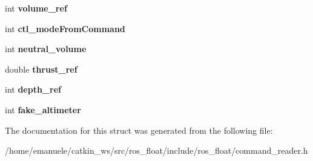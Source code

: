 \begin{DoxyCompactItemize}
\mbox{\label{structCOMMAND__DATA_aa388498d39ba68b844029475340e4e50}} 
int {\bfseries volume\+\_\+ref}
\item 
\mbox{\label{structCOMMAND__DATA_ab390b2dbaa1156a77bf6e3d080af9a35}} 
int {\bfseries ctl\+\_\+mode\+From\+Command}
\item 
\mbox{\label{structCOMMAND__DATA_a9026209f19fb19335030c597bda7ad18}} 
int {\bfseries neutral\+\_\+volume}
\item 
\mbox{\label{structCOMMAND__DATA_a2609af5c454ba633d2b944ceb129dbe3}} 
double {\bfseries thrust\+\_\+ref}
\item 
\mbox{\label{structCOMMAND__DATA_aa4a25bc088fa380f1900f6a53e323e85}} 
int {\bfseries depth\+\_\+ref}
\item 
\mbox{\label{structCOMMAND__DATA_a98b7d0b13fdf01a65ab5e9ddaf8e695e}} 
int {\bfseries fake\+\_\+altimeter}
\end{DoxyCompactItemize}


The documentation for this struct was generated from the following file\+:\begin{DoxyCompactItemize}
\item 
/home/emanuele/catkin\+\_\+ws/src/ros\+\_\+float/include/ros\+\_\+float/command\+\_\+reader.\+h\end{DoxyCompactItemize}
